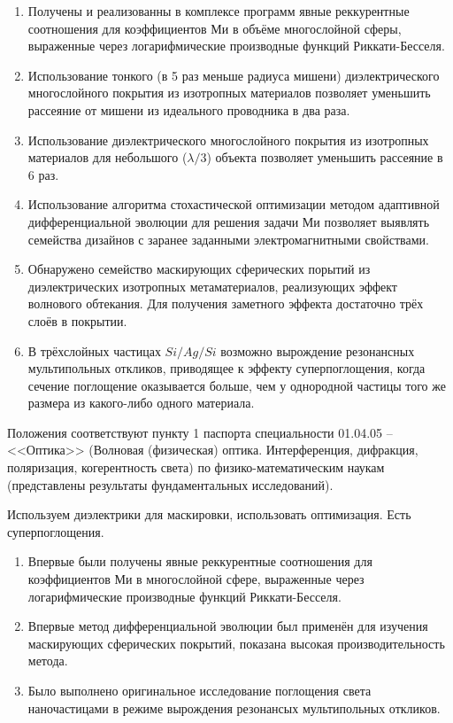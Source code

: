 \begin{enumerate}
  \item Получены и реализованны в комплексе программ явные
    реккурентные соотношения для коэффициентов Ми в объёме
    многослойной сферы, выраженные через логарифмические производные
    функций Риккати-Бесселя. %
  \item Использование тонкого (в 5 раз меньше радиуса мишени)
    диэлектрического многослойного покрытия из изотропных материалов
    позволяет уменьшить рассеяние от мишени из идеального проводника в
    два раза.
  \item Использование диэлектрического многослойного покрытия из
    изотропных материалов для небольшого ($\lambda/3$) объекта
    позволяет уменьшить рассеяние в 6 раз.
  \item Использование алгоритма стохастической оптимизации методом
    адаптивной дифференциальной эволюции для решения задачи Ми
    позволяет выявлять семейства дизайнов с заранее заданными
    электромагнитными свойствами.
  \item Обнаружено семейство маскирующих сферических порытий из
    диэлектрических изотропных метаматериалов, реализующих эффект
    волнового обтекания.  Для получения заметного эффекта достаточно
    трёх слоёв в покрытии.
  \item В трёхслойных частицах $Si/Ag/Si$ возможно вырождение
    резонансных мультипольных откликов, приводящее к эффекту
    суперпоглощения, когда сечение поглощение оказывается больше, чем
    у однородной частицы того же размера из какого-либо одного материала. 
  \end{enumerate}

Положения соответствуют пункту 1 паспорта специальности 01.04.05 --
<<Оптика>> (Волновая (физическая) оптика. Интерференция, дифракция,
поляризация, когерентность света) по физико-математическим
наукам (представлены результаты фундаментальных исследований).

\novelty Используем диэлектрики для маскировки, использовать
оптимизация. Есть суперпоглощения.
\begin{enumerate}
  \item Впервые были получены явные реккурентные соотношения для
    коэффициентов Ми в многослойной сфере, выраженные через
    логарифмические производные функций Риккати-Бесселя. 
  \item Впервые метод дифференциальной эволюции был применён
    для изучения маскирующих сферических покрытий, показана высокая
    производительность метода.
  \item Было выполнено оригинальное исследование поглощения света
    наночастицами в режиме вырождения резонансых мультипольных откликов.
\end{enumerate}

